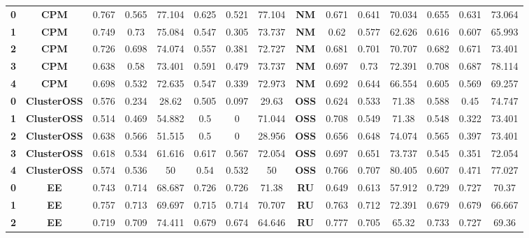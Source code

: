 {{\begin{tabular}{c|c|cccccc|ccccccc}
\textbf{0} & \textbf{CPM} & 0.767 & 0.565 & 77.104 & 0.625 & 0.521 & 77.104 & \multicolumn{1}{c|}{\textbf{NM}} & 0.671 & 0.641 & 70.034 & 0.655 & 0.631 & 73.064 \\
\textbf{1} & \textbf{CPM} & 0.749 & 0.73  & 75.084 & 0.547 & 0.305 & 73.737 & \multicolumn{1}{c|}{\textbf{NM}} & 0.62  & 0.577 & 62.626 & 0.616 & 0.607 & 65.993 \\
\textbf{2} & \textbf{CPM} & 0.726 & 0.698 & 74.074 & 0.557 & 0.381 & 72.727 & \multicolumn{1}{c|}{\textbf{NM}} & 0.681 & 0.701 & 70.707 & 0.682 & 0.671 & 73.401 \\
\textbf{3} & \textbf{CPM} & 0.638 & 0.58  & 73.401 & 0.591 & 0.479 & 73.737 & \multicolumn{1}{c|}{\textbf{NM}} & 0.697 & 0.73  & 72.391 & 0.708 & 0.687 & 78.114 \\
\textbf{4} & \textbf{CPM} & 0.698 & 0.532 & 72.635 & 0.547 & 0.339 & 72.973 & \multicolumn{1}{c|}{\textbf{NM}} & 0.692 & 0.644 & 66.554 & 0.605 & 0.569 & 69.257 \\
\textbf{0} & \textbf{ClusterOSS} & 0.576 & 0.234 & 28.62 & 0.505 & 0.097 & 29.63 & \multicolumn{1}{c|}{\textbf{OSS}} & 0.624 & 0.533 & 71.38 & 0.588 & 0.45  & 74.747 \\
\textbf{1} & \textbf{ClusterOSS} & 0.514 & 0.469 & 54.882 & 0.5   & 0     & 71.044 & \multicolumn{1}{c|}{\textbf{OSS}} & 0.708 & 0.549 & 71.38 & 0.548 & 0.322 & 73.401 \\
\textbf{2} & \textbf{ClusterOSS} & 0.638 & 0.566 & 51.515 & 0.5   & 0     & 28.956 & \multicolumn{1}{c|}{\textbf{OSS}} & 0.656 & 0.648 & 74.074 & 0.565 & 0.397 & 73.401 \\
\textbf{3} & \textbf{ClusterOSS} & 0.618 & 0.534 & 61.616 & 0.617 & 0.567 & 72.054 & \multicolumn{1}{c|}{\textbf{OSS}} & 0.697 & 0.651 & 73.737 & 0.545 & 0.351 & 72.054 \\
\textbf{4} & \textbf{ClusterOSS} & 0.574 & 0.536 & 50    & 0.54  & 0.532 & 50    & \multicolumn{1}{c|}{\textbf{OSS}} & 0.766 & 0.707 & 80.405 & 0.607 & 0.471 & 77.027 \\
\textbf{0} & \textbf{EE} & 0.743 & 0.714 & 68.687 & 0.726 & 0.726 & 71.38 & \multicolumn{1}{c|}{\textbf{RU}} & 0.649 & 0.613 & 57.912 & 0.729 & 0.727 & 70.37 \\
\textbf{1} & \textbf{EE} & 0.757 & 0.713 & 69.697 & 0.715 & 0.714 & 70.707 & \multicolumn{1}{c|}{\textbf{RU}} & 0.763 & 0.712 & 72.391 & 0.679 & 0.679 & 66.667 \\
\textbf{2} & \textbf{EE} & 0.719 & 0.709 & 74.411 & 0.679 & 0.674 & 64.646 & \multicolumn{1}{c|}{\textbf{RU}} & 0.777 & 0.705 & 65.32 & 0.733 & 0.727 & 69.36 \\

\end{tabular}}}
